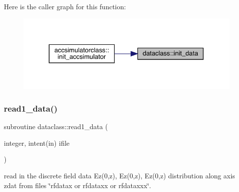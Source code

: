Here is the caller graph for this function\+:\nopagebreak
\begin{figure}[H]
\begin{center}
\leavevmode
\includegraphics[width=318pt]{namespacedataclass_a474ffe5e76484d63015aaf6255c27294_icgraph}
\end{center}
\end{figure}
\mbox{\label{namespacedataclass_a6733af7e3067d69140c61e2b4580a70b}} 
\subsubsection{\texorpdfstring{read1\_data()}{read1\_data()}}
{\footnotesize\ttfamily subroutine dataclass\+::read1\+\_\+data (\begin{DoxyParamCaption}\item[{integer, intent(in)}]{ifile }\end{DoxyParamCaption})}



read in the discrete field data Ez(0,z), Ez\textquotesingle{}(0,z), Ez\textquotesingle{}\textquotesingle{}(0,z) distribution along axis zdat from files \char`\"{}rfdatax or rfdataxx 
 or rfdataxxx\char`\"{}. 

